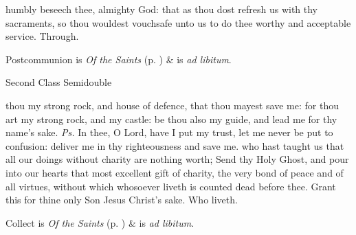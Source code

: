 \postcommunion
{} humbly beseech thee, almighty God: that as thou dost refresh us with thy sacraments, so thou wouldest vouchsafe unto us to do thee worthy and acceptable service. Through.
\begin{rubric}
     Postcommunion is \emph{Of the Saints} (p. \pageref{SPSaints}) \&  is \emph{ad libitum}.
\end{rubric}

\begin{inhead}
{Second Class Semidouble}
\end{inhead}

\properantiphonfix

\introit
{} thou my strong rock, and house of defence, that thou mayest save me: for thou art my strong rock, and my castle: be thou also my guide, and lead me for thy name's sake. \textit{Ps.} In thee, O Lord, have I put my trust, let me never be put to confusion: deliver me in thy righteousness and save me.
\collect
{} who hast taught us that all our doings without charity are nothing worth; Send thy Holy Ghost, and pour into our hearts that most excellent gift of charity, the very bond of peace and of all virtues, without which whosoever liveth is counted dead before thee. Grant this for thine only Son Jesus Christ's sake. Who liveth.
\begin{rubric}
     Collect is \emph{Of the Saints} (p. \pageref{SPSaints}) \&  is \emph{ad libitum}.
\end{rubric}

